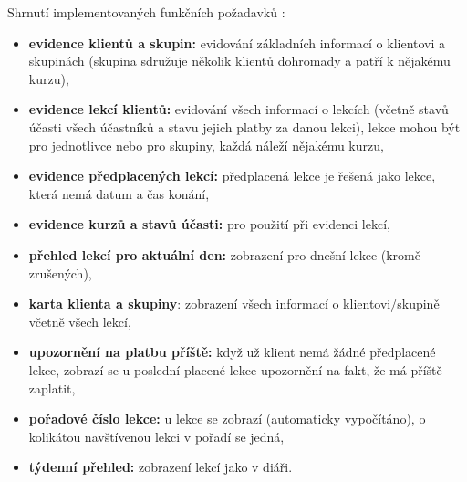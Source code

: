 Shrnutí implementovaných funkčních požadavků \cite{bp}:
\begin{itemize}
    \item \textbf{evidence klientů a skupin:} evidování základních informací o klientovi a skupinách (skupina sdružuje několik klientů dohromady a patří k nějakému kurzu),
    \item \textbf{evidence lekcí klientů:} evidování všech informací o lekcích (včetně stavů účasti všech účastníků a stavu jejich platby za danou lekci), lekce mohou být pro jednotlivce nebo pro skupiny, každá náleží nějakému kurzu,
    \item \textbf{evidence předplacených lekcí:} předplacená lekce je řešená jako lekce, která nemá datum a čas konání,
    \item \textbf{evidence kurzů a stavů účasti:} pro použití při evidenci lekcí,
    \item \textbf{přehled lekcí pro aktuální den:} zobrazení pro dnešní lekce (kromě zrušených),
    \item \textbf{karta klienta a skupiny}: zobrazení všech informací o klientovi/skupině včetně všech lekcí,
    \item \textbf{upozornění na platbu příště:} když už klient nemá žádné předplacené lekce, zobrazí se u poslední placené lekce upozornění na fakt, že má příště zaplatit,
    \item \textbf{pořadové číslo lekce:} u lekce se zobrazí (automaticky vypočítáno), o kolikátou navštívenou lekci v pořadí se jedná,
    \item \textbf{týdenní přehled:} zobrazení lekcí jako v diáři.
\end{itemize}

